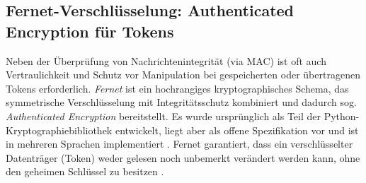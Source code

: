 \subsection{Fernet-Verschlüsselung: Authenticated Encryption für Tokens}

Neben der Überprüfung von Nachrichtenintegrität (via MAC) ist oft auch Vertraulichkeit und Schutz vor Manipulation bei gespeicherten oder übertragenen Tokens erforderlich. \textit{Fernet} ist ein hochrangiges kryptographisches Schema, das symmetrische Verschlüsselung mit Integritätsschutz kombiniert und dadurch sog. \textit{Authenticated Encryption} bereitstellt. Es wurde ursprünglich als Teil der Python-Kryptographiebibliothek entwickelt, liegt aber als offene Spezifikation vor und ist in mehreren Sprachen implementiert \cite{cryptographyFernet}. Fernet garantiert, dass ein verschlüsselter Datenträger (Token) weder gelesen noch unbemerkt verändert werden kann, ohne den geheimen Schlüssel zu besitzen \cite{cryptographyFernet}.

